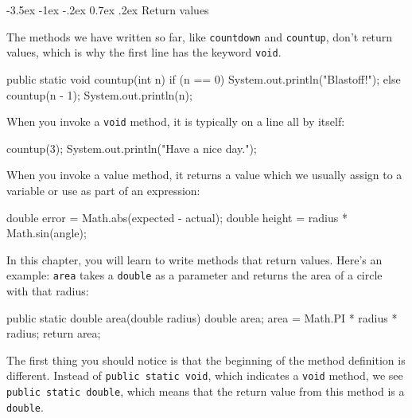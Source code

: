 \documentclass[12pt]{book}
\makeatletter
\theoremstyle{exercise}
\newcommand{\java}[1]{\verb"#1"}
\renewcommand{\section}{\@startsection{section}{1}{\z@}%
    {-3.5ex \@plus -1ex \@minus -.2ex}%
    {0.7ex \@plus.2ex}%
    {\normalfont\Large\bfseries}}
\newcommand{\java}[1]{\lstinline{#1}} %
\makeatother
\begin{document}
\section{Return values}


The methods we have written so far, like \java{countdown} and \java{countup}, don't return values, which is why the first line has the keyword \java{void}.

\begin{code}
    public static void countup(int n) {
        if (n == 0) {
            System.out.println("Blastoff!");
        } else {
            countup(n - 1);
            System.out.println(n);
        }
    }
\end{code}

When you invoke a \java{void} method, it is typically on a line all by itself:

\begin{code}
    countup(3);
    System.out.println("Have a nice day.");
\end{code}

When you invoke a value method, it returns a value which we usually assign to a variable or use as part of an expression:

\begin{code}
    double error = Math.abs(expected - actual);
    double height = radius * Math.sin(angle);
\end{code}


In this chapter, you will learn to write methods that return values.
Here's an example:  \java{area} takes a \java{double} as a parameter and returns the area of a circle with that radius:

\begin{code}
    public static double area(double radius) {
        double area;
        area = Math.PI * radius * radius;
        return area;
    }
\end{code}

The first thing you should notice is that the beginning of the method definition is different.
Instead of \java{public static void}, which indicates a \java{void} method, we see \java{public static double}, which means that the return value from this method is a \java{double}.

\end{document}
